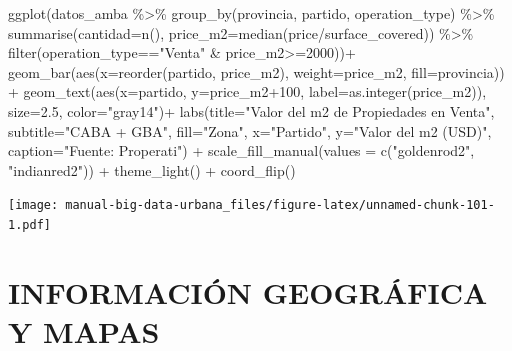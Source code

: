 \documentclass[
  spanish,
]{book}
\newenvironment{Shaded}{\begin{snugshade}}{\end{snugshade}}
\newcommand{\AttributeTok}[1]{\textcolor[rgb]{0.77,0.63,0.00}{#1}}
\newcommand{\DecValTok}[1]{\textcolor[rgb]{0.00,0.00,0.81}{#1}}
\newcommand{\FloatTok}[1]{\textcolor[rgb]{0.00,0.00,0.81}{#1}}
\newcommand{\FunctionTok}[1]{\textcolor[rgb]{0.00,0.00,0.00}{#1}}
\newcommand{\NormalTok}[1]{#1}
\newcommand{\SpecialCharTok}[1]{\textcolor[rgb]{0.00,0.00,0.00}{#1}}
\newcommand{\StringTok}[1]{\textcolor[rgb]{0.31,0.60,0.02}{#1}}
\begin{document}
\begin{Shaded}
\begin{Highlighting}[]
\FunctionTok{ggplot}\NormalTok{(datos\_amba }\SpecialCharTok{\%\textgreater{}\%}
        \FunctionTok{group\_by}\NormalTok{(provincia, partido, operation\_type) }\SpecialCharTok{\%\textgreater{}\%}
        \FunctionTok{summarise}\NormalTok{(}\AttributeTok{cantidad=}\FunctionTok{n}\NormalTok{(),}
                  \AttributeTok{price\_m2=}\FunctionTok{median}\NormalTok{(price}\SpecialCharTok{/}\NormalTok{surface\_covered)) }\SpecialCharTok{\%\textgreater{}\%}
        \FunctionTok{filter}\NormalTok{(operation\_type}\SpecialCharTok{==}\StringTok{"Venta"} \SpecialCharTok{\&}\NormalTok{ price\_m2}\SpecialCharTok{\textgreater{}=}\DecValTok{2000}\NormalTok{))}\SpecialCharTok{+}
  \FunctionTok{geom\_bar}\NormalTok{(}\FunctionTok{aes}\NormalTok{(}\AttributeTok{x=}\FunctionTok{reorder}\NormalTok{(partido, price\_m2), }\AttributeTok{weight=}\NormalTok{price\_m2, }\AttributeTok{fill=}\NormalTok{provincia)) }\SpecialCharTok{+}
  \FunctionTok{geom\_text}\NormalTok{(}\FunctionTok{aes}\NormalTok{(}\AttributeTok{x=}\NormalTok{partido, }\AttributeTok{y=}\NormalTok{price\_m2}\SpecialCharTok{+}\DecValTok{100}\NormalTok{, }\AttributeTok{label=}\FunctionTok{as.integer}\NormalTok{(price\_m2)), }\AttributeTok{size=}\FloatTok{2.5}\NormalTok{, }\AttributeTok{color=}\StringTok{"gray14"}\NormalTok{)}\SpecialCharTok{+}
  \FunctionTok{labs}\NormalTok{(}\AttributeTok{title=}\StringTok{"Valor del m2 de Propiedades en Venta"}\NormalTok{,}
       \AttributeTok{subtitle=}\StringTok{"CABA + GBA"}\NormalTok{,}
       \AttributeTok{fill=}\StringTok{"Zona"}\NormalTok{,}
       \AttributeTok{x=}\StringTok{"Partido"}\NormalTok{,}
       \AttributeTok{y=}\StringTok{"Valor del m2 (USD)"}\NormalTok{,}
       \AttributeTok{caption=}\StringTok{"Fuente: Properati"}\NormalTok{) }\SpecialCharTok{+}
  \FunctionTok{scale\_fill\_manual}\NormalTok{(}\AttributeTok{values =} \FunctionTok{c}\NormalTok{(}\StringTok{"goldenrod2"}\NormalTok{, }\StringTok{"indianred2"}\NormalTok{)) }\SpecialCharTok{+}
  \FunctionTok{theme\_light}\NormalTok{() }\SpecialCharTok{+}
  \FunctionTok{coord\_flip}\NormalTok{()}
\end{Highlighting}
\end{Shaded}

\texttt{[image: manual-big-data-urbana\_files/figure-latex/unnamed-chunk-101-1.pdf]}

\hypertarget{informaciuxf3n-geogruxe1fica-y-mapas}{%
\chapter{INFORMACIÓN GEOGRÁFICA Y MAPAS}\label{informaciuxf3n-geogruxe1fica-y-mapas}}
\end{document}
